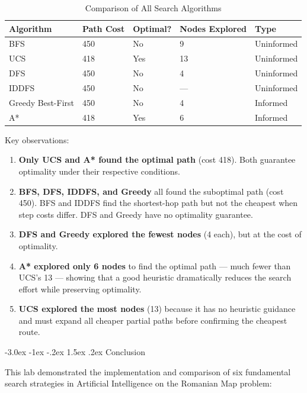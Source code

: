 \documentclass[12pt,a4paper]{article}
\makeatletter
\renewcommand{\section}{\@startsection{section}{1}{\z@}%
  {-3.0ex \@plus -1ex \@minus -.2ex}%
  {1.5ex \@plus.2ex}%
  {\normalfont\Large\bfseries\color{primaryblue}}}
\makeatother
\begin{document}
\begin{table}[H]
\centering
\caption{Comparison of All Search Algorithms}
\begin{tabularx}{\textwidth}{@{}lXXXX@{}}
\toprule
\textbf{Algorithm} & \textbf{Path Cost} & \textbf{Optimal?} & \textbf{Nodes Explored} & \textbf{Type} \\
\midrule
BFS & 450 & No & 9 & Uninformed \\
UCS & 418 & Yes & 13 & Uninformed \\
DFS & 450 & No & 4 & Uninformed \\
IDDFS & 450 & No & --- & Uninformed \\
Greedy Best-First & 450 & No & 4 & Informed \\
A* & 418 & Yes & 6 & Informed \\
\bottomrule
\end{tabularx}
\end{table}

Key observations:
\begin{enumerate}
  \item \textbf{Only UCS and A* found the optimal path} (cost 418). Both guarantee optimality under their respective conditions.
  \item \textbf{BFS, DFS, IDDFS, and Greedy} all found the suboptimal path (cost 450). BFS and IDDFS find the shortest-hop path but not the cheapest when step costs differ. DFS and Greedy have no optimality guarantee.
  \item \textbf{DFS and Greedy explored the fewest nodes} (4 each), but at the cost of optimality.
  \item \textbf{A* explored only 6 nodes} to find the optimal path --- much fewer than UCS's 13 --- showing that a good heuristic dramatically reduces the search effort while preserving optimality.
  \item \textbf{UCS explored the most nodes} (13) because it has no heuristic guidance and must expand all cheaper partial paths before confirming the cheapest route.
\end{enumerate}

\newpage
\section{Conclusion}

This lab demonstrated the implementation and comparison of six fundamental search strategies in Artificial Intelligence on the Romanian Map problem:
\end{document}
